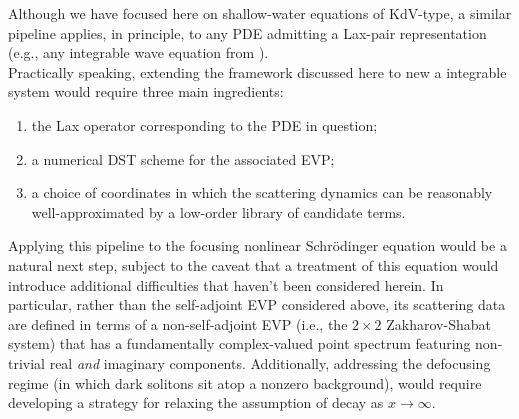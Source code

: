 \documentclass[journal=gmj]{CUP-JNL-DTM}%
\theoremstyle{definition}
\numberwithin{equation}{section}
\begin{document}
Although we have focused here on shallow-water equations of KdV-type, a similar pipeline applies, in principle, to any PDE admitting a Lax-pair representation (e.g., any integrable wave equation from \cite{Ablowitz.etal1974StudApplMath}).\\ Practically speaking, extending the framework discussed here to new a integrable system would require three main ingredients: \begin{enumerate}
    \item the Lax operator corresponding to the PDE in question;

    \smallskip
    
    \item a numerical DST scheme for the associated EVP;

    \smallskip
    
    \item a choice of coordinates in which the scattering dynamics can be reasonably well-approximated by a low-order library of candidate terms.
\end{enumerate} Applying this pipeline to the focusing nonlinear Schr\"odinger equation would be a natural next step, subject to the caveat that a treatment of this equation would introduce additional difficulties that haven't been considered herein. In particular, rather than the self-adjoint EVP considered above, its scattering data are defined in terms of a non-self-adjoint EVP (i.e., the $2\!\times\!2$ Zakharov-Shabat system) that has a fundamentally complex-valued point spectrum featuring non-trivial real \textit{and} imaginary components. Additionally, addressing the defocusing regime (in which dark solitons sit atop a nonzero background), would require developing a strategy for relaxing the assumption of decay as $x \rightarrow \infty$.


\smallskip
\end{document}
